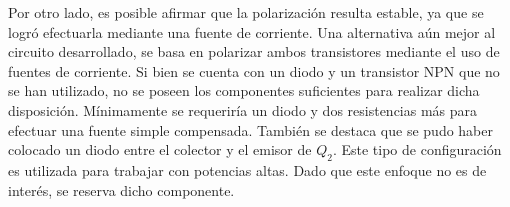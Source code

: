 Por otro lado, es posible afirmar que la polarización resulta estable, ya que se logró efectuarla mediante una fuente de corriente. Una alternativa aún mejor al circuito desarrollado, se basa en polarizar ambos transistores mediante el uso de fuentes de corriente. Si bien se cuenta con un diodo y un transistor NPN que no se han utilizado, no se poseen los componentes suficientes para realizar dicha disposición. Mínimamente se requeriría un diodo y dos resistencias más para efectuar una fuente simple compensada. También se destaca que se pudo haber colocado un diodo entre el colector y el emisor de $Q_2$. Este tipo de configuración es utilizada para trabajar con potencias altas. Dado que este enfoque no es de interés, se reserva dicho componente.
	
